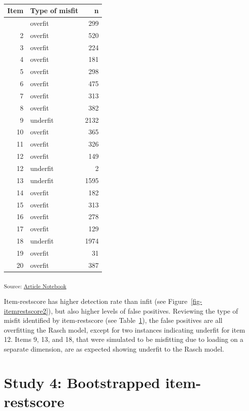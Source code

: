 \documentclass[
  letterpaper,
  DIV=11,
  numbers=noendperiod]{scrartcl}
\begin{document}
\begin{longtable}[]{@{}rlr@{}}

\caption{\label{tbl-overunder}}

\tabularnewline

\toprule\noalign{}
Item & Type of misfit & n \\
\midrule\noalign{}
\endhead
\bottomrule\noalign{}
\endlastfoot
1 & overfit & 299 \\
2 & overfit & 520 \\
3 & overfit & 224 \\
4 & overfit & 181 \\
5 & overfit & 298 \\
6 & overfit & 475 \\
7 & overfit & 313 \\
8 & overfit & 382 \\
9 & underfit & 2132 \\
10 & overfit & 365 \\
11 & overfit & 326 \\
12 & overfit & 149 \\
12 & underfit & 2 \\
13 & underfit & 1595 \\
14 & overfit & 182 \\
15 & overfit & 313 \\
16 & overfit & 278 \\
17 & overfit & 129 \\
18 & underfit & 1974 \\
19 & overfit & 31 \\
20 & overfit & 387 \\

\end{longtable}

\textsubscript{Source:
\href{https://pgmj.github.io/rasch_itemfit/index.qmd.html}{Article
Notebook}}

Item-restscore has higher detection rate than infit (see
Figure~\ref{fig-itemrestscore2}), but also higher levels of false
positives. Reviewing the type of misfit identified by item-restscore
(see Table~\ref{tbl-overunder}), the false positives are all overfitting
the Rasch model, except for two instances indicating underfit for item
12. Items 9, 13, and 18, that were simulated to be misfitting due to
loading on a separate dimension, are as expected showing underfit to the
Rasch model.

\section{Study 4: Bootstrapped
item-restscore}\label{study-4-bootstrapped-item-restscore}
\end{document}
